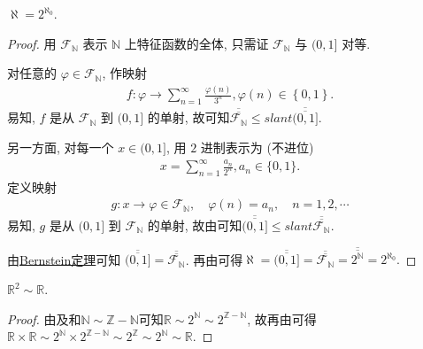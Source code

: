 \documentclass[../../main.tex]{subfiles}
\begin{document}
\begin{theorem}\label{theorem:aleph = 2^{aleph_0}}
$\aleph = 2^{\aleph_0}$.
\end{theorem}
\begin{proof}
用 $\mathcal{F}_{\mathbb{N}}$ 表示 $\mathbb{N}$ 上特征函数的全体, 只需证 $\mathcal{F}_{\mathbb{N}}$ 与 $(0, 1]$ 对等.

对任意的 $\varphi \in \mathcal{F}_{\mathbb{N}}$, 作映射
\begin{align*}
f:\varphi \rightarrow \sum_{n=1}^{\infty}{\frac{\varphi (n)}{3^n}},\varphi \left( n \right) \in \left\{ 0,1 \right\} .
\end{align*}
易知, $f$ 是从 $\mathcal{F}_{\mathbb{N}}$ 到 $(0, 1]$ 的单射, 故可知$\overline{\overline{\mathcal{F}_{\mathbb{N}}}} \leqslant slant \overline{\overline{(0, 1]}}$.

另一方面, 对每一个 $x \in (0, 1]$, 用 $2$ 进制表示为 (不进位)
\begin{align*}
x = \sum_{n = 1}^{\infty} \frac{a_n}{2^n}, a_n \in \{0, 1\}.
\end{align*}
定义映射
\begin{align*}
g : x \to \varphi \in \mathcal{F}_{\mathbb{N}}, \quad \varphi(n) = a_n, \quad n = 1, 2, \cdots
\end{align*}
易知, $g$ 是从 $(0, 1]$ 到 $\mathcal{F}_{\mathbb{N}}$ 的单射, 故由可知$\overline{\overline{(0, 1]}} \leqslant slant \overline{\overline{\mathcal{F}_{\mathbb{N}}}}$.

由\hyperref[theorem:Bernstein定理]{Bernstein定理}可知 $\overline{\overline{(0, 1]}} = \overline{\overline{\mathcal{F}_{\mathbb{N}}}}$. 再由可得$\aleph =\overline{\overline{(0,1]}}=\overline{\overline{\mathcal{F} _{\mathbb{N}}}}=\overline{\overline{2^{\mathbb{N}}}}=2^{\aleph _0}.$
\end{proof}

\begin{example}
$\mathbb{R}^2 \sim \mathbb{R}$.
\end{example}
\begin{proof}
由及和$\mathbb{N}\sim \mathbb{Z}-\mathbb{N}$可知$\mathbb{R} \sim 2^{\mathbb{N}} \sim 2^{\mathbb{Z} - \mathbb{N}}$, 故再由可得$\mathbb{R} \times \mathbb{R} \sim 2^{\mathbb{N}} \times 2^{\mathbb{Z} - \mathbb{N}} \sim 2^{\mathbb{Z}} \sim 2^{\mathbb{N}} \sim \mathbb{R}$.
\end{proof}
\end{document}
